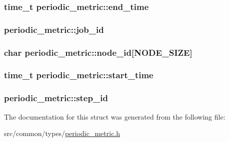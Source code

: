 \subsubsection[{\texorpdfstring{end\+\_\+time}{end_time}}]{\setlength{\rightskip}{0pt plus 5cm}time\+\_\+t periodic\+\_\+metric\+::end\+\_\+time}\hypertarget{structperiodic__metric_a6030e589cefc38b5d72df99a6f84c3e7}{}\label{structperiodic__metric_a6030e589cefc38b5d72df99a6f84c3e7}
\subsubsection[{\texorpdfstring{job\+\_\+id}{job_id}}]{ periodic\+\_\+metric\+::job\+\_\+id}\hypertarget{structperiodic__metric_a3f291340bc0cb4d36477ced1e9437e88}{}\label{structperiodic__metric_a3f291340bc0cb4d36477ced1e9437e88}
\subsubsection[{\texorpdfstring{node\+\_\+id}{node_id}}]{\setlength{\rightskip}{0pt plus 5cm}char periodic\+\_\+metric\+::node\+\_\+id\mbox{[}{\bf N\+O\+D\+E\+\_\+\+S\+I\+ZE}\mbox{]}}\hypertarget{structperiodic__metric_a3814ce3bd13bd481d2a05ef775e9707e}{}\label{structperiodic__metric_a3814ce3bd13bd481d2a05ef775e9707e}
\subsubsection[{\texorpdfstring{start\+\_\+time}{start_time}}]{\setlength{\rightskip}{0pt plus 5cm}time\+\_\+t periodic\+\_\+metric\+::start\+\_\+time}\hypertarget{structperiodic__metric_aed28436309ae898ce1aac2eb595ed5a7}{}\label{structperiodic__metric_aed28436309ae898ce1aac2eb595ed5a7}
\subsubsection[{\texorpdfstring{step\+\_\+id}{step_id}}]{ periodic\+\_\+metric\+::step\+\_\+id}\hypertarget{structperiodic__metric_a8e72fe1eb440769787e10132b9434b15}{}\label{structperiodic__metric_a8e72fe1eb440769787e10132b9434b15}


The documentation for this struct was generated from the following file\+:\begin{DoxyCompactItemize}
\item 
src/common/types/\hyperlink{periodic__metric_8h}{periodic\+\_\+metric.\+h}\end{DoxyCompactItemize}
